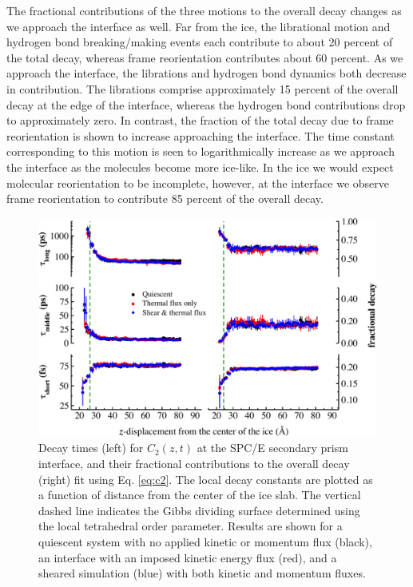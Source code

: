 The fractional contributions of the three motions to the overall decay
changes as we approach the interface as well. Far from the ice, the
librational motion and hydrogen bond breaking/making events each
contribute to about 20 percent of the total decay, whereas frame
reorientation contributes about 60 percent. As we approach the
interface, the librations and hydrogen bond dynamics both decrease in
contribution. The librations comprise approximately 15 percent of the
overall decay at the edge of the interface, whereas the hydrogen bond
contributions drop to approximately zero. In contrast, the fraction of
the total decay due to frame reorientation is shown to increase
approaching the interface.  The time constant corresponding to this
motion is seen to logarithmically increase as we approach the interface
as the molecules become more ice-like. In the ice we would expect
molecular reorientation to be incomplete, however, at the interface we
observe frame reorientation to contribute 85 percent of the overall
decay.


\begin{figure}
\includegraphics[width=\linewidth]{Figures/Sec_lcorrz}
\caption{\label{fig:SPorient} Decay times (left) for $C_2(z,t)$ at the
  SPC/E secondary prism interface, and their fractional contributions to the
  overall decay (right) fit using Eq. \eqref{eq:c2}. The local decay
  constants are plotted as a function of distance from the center of
  the ice slab. The vertical dashed line indicates the Gibbs dividing
  surface determined using the local tetrahedral order parameter.
  Results are shown for a quiescent system with no applied kinetic or
  momentum flux (black), an interface with an imposed
  kinetic energy flux (red), and a sheared simulation (blue) with both
  kinetic and momentum fluxes.}
\end{figure}

